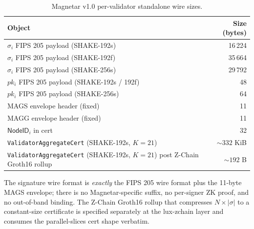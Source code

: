 \begin{table}[H]
\centering
\caption{Magnetar v1.0 per-validator standalone wire sizes.}
\label{tab:wire-sizes}
\begin{tabular}{lr}
\toprule
Object & Size (bytes) \\
\midrule
$\sigma_i$ FIPS 205 payload (SHAKE-192s) & 16\,224 \\
$\sigma_i$ FIPS 205 payload (SHAKE-192f) & 35\,664 \\
$\sigma_i$ FIPS 205 payload (SHAKE-256s) & 29\,792 \\
$pk_i$ FIPS 205 payload (SHAKE-192s / 192f) & 48 \\
$pk_i$ FIPS 205 payload (SHAKE-256s) & 64 \\
MAGS envelope header (fixed) & 11 \\
MAGG envelope header (fixed) & 11 \\
$\mathsf{NodeID}_i$ in cert & 32 \\
\midrule
\texttt{ValidatorAggregateCert} (SHAKE-192s, $K=21$) & $\sim 332$ KiB \\
\texttt{ValidatorAggregateCert} (SHAKE-192s, $K=21$) post Z-Chain Groth16 rollup & $\sim 192$ B \\
\bottomrule
\end{tabular}
\end{table}

The signature wire format is \emph{exactly} the FIPS 205 wire format
plus the 11-byte MAGS envelope; there is no Magnetar-specific
suffix, no per-signer ZK proof, and no out-of-band binding. The
Z-Chain Groth16 rollup that compresses $N \times |\sigma|$ to a
constant-size certificate is specified separately at the lux-zchain
layer and consumes the parallel-slices cert shape verbatim.
